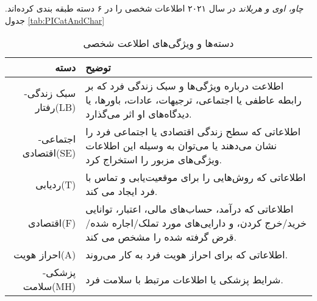 \ifTheEffectsOfDifferentPersonalData
	\textit{چاو، اوی و هربلاند}
	در سال ۲۰۲۱ اطلاعات شخصی را در ۶ دسته طبقه بندی کرده‌اند.
	\citep{chuaEffectsDifferentPersonal2021}
	جدول
	\eqref{tab:PICatAndChar}
	\begin{table}[ht]
		\caption{دسته‌ها و ویژگی‌های اطلاعت شخصی}
		\label{tab:PICatAndChar}
		\centering
		\onehalfspacing
		\begin{tabularx}{\linewidth}{ r X }
			دسته
			 &
			توضیح
			\\
			\hline
			سبک زندگی-رفتار(LB)
			 &
			اطلاعت درباره ویژگی‌ها و سبک زندگی فرد که بر رابطه عاطفی یا
			اجتماعی، ترجیهات، عادات، باورها، یا دیدگاه‌های او اثر می‌گذارد.
			\\
			اجتماعی-اقتصادی(SE)
			 &
			اطلاعاتی که سطح زندگی اقتصادی یا اجتماعی فرد را نشان می‌دهند یا
			می‌توان به وسیله این اطلاعات ویژگی‌های مزبور را استخراج کرد.
			\\
			ردیابی(T)
			 &
			اطلاعاتی که روش‌هایی را برای موقعیت‌یابی و تماس با فرد ایجاد می کند.
			\\
			اقتصادی(F)
			 &
			اطلاعاتی که درآمد، حساب‌های مالی، اعتبار، توانایی خرید/خرج کردن، و
			دارایی‌های مورد تملک/اجاره شده/قرض گرفته شده را مشخص می کند.
			\\
			احراز هویت(A)
			 &
			اطلاعاتی که برای احراز هویت فرد به کار می‌روند.
			\\
			پزشکی-سلامت(MH)
			 &
			شرایط پزشکی  یا اطلاعات مرتبط با سلامت فرد.
			\\
		\end{tabularx}
	\end{table}
